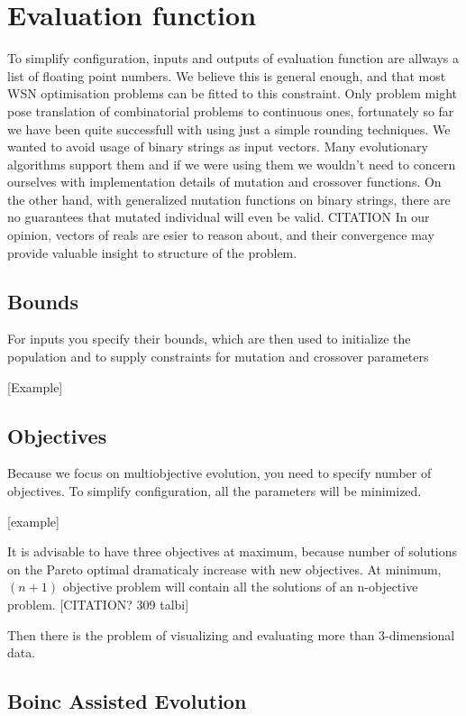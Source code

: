 \documentclass[12pt,oneside,draft]{fithesis2}
\begin{document}
\section{Evaluation function}

To simplify configuration, inputs and outputs of evaluation function are allways a list of floating point numbers. We believe this is general enough, and that most WSN optimisation problems can be fitted to this constraint. Only problem might pose translation of combinatorial problems to continuous ones, fortunately so far we have been quite successfull with using just a simple rounding techniques. We wanted to avoid usage of binary strings as input vectors. Many evolutionary algorithms support them and if we were using them we wouldn't need to concern ourselves with implementation details of mutation and crossover functions. On the other hand, with generalized mutation functions on binary strings, there are no guarantees that mutated individual will even be valid. CITATION In our opinion, vectors of reals are esier to reason about, and their convergence may provide valuable insight to structure of the problem.

\subsection{Bounds}
For inputs you specify their bounds, which are then used to initialize the population and to supply constraints for mutation and crossover parameters

[Example]

\subsection{Objectives}

Because we focus on multiobjective evolution, you need to specify number of objectives. To simplify configuration, all the parameters will be minimized.

[example]

It is advisable to have three objectives at maximum, because number of solutions on the Pareto optimal dramaticaly increase with new objectives.
At minimum, $(n+1)$ objective problem will contain all the solutions of an n-objective problem. [CITATION? 309 talbi]

Then there is the problem of visualizing and evaluating more than 3-dimensional data.

\subsection{Boinc Assisted Evolution}
\end{document}
